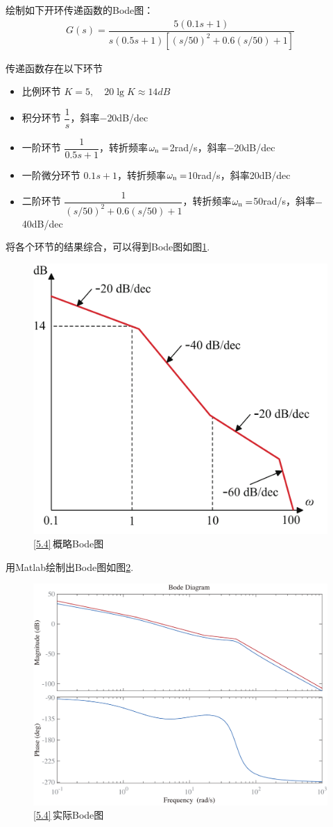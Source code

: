 \examples \label{5.4}绘制如下开环传递函数的Bode图：
\begin{align*}
	G(s) = \dfrac{5(0.1s + 1)}{s (0.5s + 1) \left[\left(s/50\right)^2 + 0.6 \left(s/50\right) + 1\right]}
\end{align*}

\solve 传递函数存在以下环节
\begin{itemize}
	\item 比例环节 \quad $K = 5, \quad 20\lg K \approx 14 dB$
	\item 积分环节 \quad $\dfrac{1}{s}$，斜率$-$20dB/dec
	\item 一阶环节 \quad $\dfrac{1}{0.5s + 1}$，转折频率$\omega_{{\rm{n}}} = $2rad/s，斜率$-$20dB/dec
	\item 一阶微分环节 \quad $0.1s + 1$，转折频率$\omega_{{\rm{n}}} = $10rad/s，斜率20dB/dec
	\item 二阶环节 \quad $\dfrac{1}{\left(s/50\right)^2 + 0.6 \left(s/50\right) + 1}$，转折频率$\omega_{{\rm{n}}} = $50rad/s，斜率$-$40dB/dec
\end{itemize}
将各个环节的结果综合，可以得到Bode图如图\ref{F5.4}.
\begin{figure}[!htb]
	\centering
	\includegraphics[width=0.45\linewidth]{pic/5.4.pdf}
	\caption{\ref{5.4}$\,$概略Bode图}
	\label{F5.4}
\end{figure}

用Matlab绘制出Bode图如图\ref{F5.4.2}.
\begin{figure}[!htb]
	\centering
	\includegraphics[width=0.7\linewidth]{pic/5.4.bode.pdf}
	\caption{\ref{5.4}$\,$实际Bode图}
	\label{F5.4.2}
\end{figure}
\newpage

